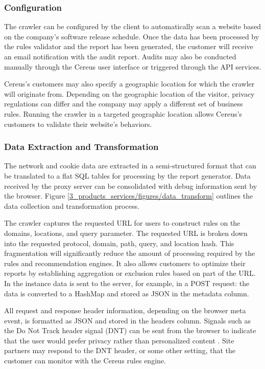 \subsubsection*{Configuration}

The crawler can be configured by the client to automatically scan a website based on the company's software release schedule. Once the data has been processed by the rules validator and the report has been generated, the customer will receive an email notification with the audit report. Audits may also be conducted manually through the Cereus user interface or triggered through the API services.

Cereus's customers may also specify a geographic location for which the crawler will originate from. Depending on the geographic location of the visitor, privacy regulations can differ and the company may apply a different set of business rules. Running the crawler in a targeted geographic location allows Cereus's customers to validate their website's behaviors.

\subsubsection*{Data Extraction and Transformation}

The network and cookie data are extracted in a semi-structured format that can be translated to a flat SQL tables for processing by the report generator. Data received by the proxy server can be consolidated with debug information sent by the browser. Figure \ref{3_products_services/figures/data_transform} outlines the data collection and transformation process.

The crawler captures the requested URL for users to construct rules on the domains, locations, and query parameter. The requested URL is broken down into the requested protocol, domain, path, query, and location hash. This fragmentation will significantly reduce the amount of processing required by the rules and recommendation engines. It also allows customers to optimize their reports by establishing aggregation or exclusion rules based on part of the URL. In the instance data is sent to the server, for example, in a POST request: the data is converted to a HashMap and stored as JSON in the metadata column.

All request and response header information, depending on the browser meta event, is formatted as JSON and stored in the headers column. Signals such as the Do Not Track header signal (DNT) can be sent from the browser to indicate that the user would prefer privacy rather than personalized content \cite{mdn.2020}. Site partners may respond to the DNT header, or some other setting, that the customer can monitor with the Cereus rules engine.

